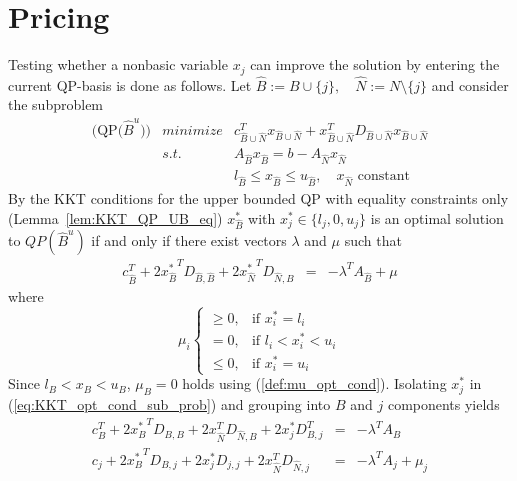 \documentclass[a4paper]{article}
\begin{document}
\section{Pricing}
Testing whether a nonbasic variable $x_{j}$ can improve the solution by entering the current QP-basis is done as follows.
Let $\hat{B}:=B \cup \{j\}, \quad \hat{N}:=N \setminus \{j\}$ and consider the subproblem
\begin{eqnarray}
  \mbox{(QP($\hat{B}^{u}$))} &minimize& c_{\hat{B} \cup \hat{N}}^{T}
    x_{\hat{B} \cup \hat{N}} +
    x_{\hat{B} \cup \hat{N}}^{T}
    D_{\hat{B} \cup \hat{N}}x_{\hat{B} \cup \hat{N}}
\nonumber      \\
\label{eq:QP_UB_sub_feas_cons}
    & s.t. & A_{\hat{B}}x_{\hat{B}} = b - A_{\hat{N}}
    x_{\hat{N}}  \\
\label{eq:QP_UB_sub_var_feas_cons}
    & & l_{\hat{B}} \leq x_{\hat{B}} \leq u_{\hat{B}},
    \quad x_{\hat{N}} \text{ constant}  
\end{eqnarray}
By the KKT conditions for the upper bounded QP with equality constraints only (Lemma~\ref{lem:KKT_QP_UB_eq}) $x_{\hat{B}}^{*}$ with
$x_{j}^{*} \in \{l_{j}, 0, u_{j}\}$
is an optimal solution to $QP(\hat{B}^{u})$ if and only if there exist vectors
$\lambda$ and $\mu$ such that
\begin{eqnarray}
\label{eq:KKT_opt_cond_sub_prob}
c_{\hat{B}}^{T}+2{x_{\hat{B}}^{*}}^{T}D_{\hat{B}, \hat{B}}
+2{x_{\hat{N}}^{*}}^{T}D_{\hat{N}, \hat{B}}
& = &
-\lambda^{T}A_{\hat{B}}+\mu 
\end{eqnarray}
where
\begin{equation}
\label{eq:KKT_opt_cond_sub_prob_mu}
\mu_{i}
\left\{
\begin{array}{ll}
\geq 0,
&
\text{if $x_{i}^{*}=l_{i}$} \\
=0,
&
\text{if $l_{i} < x_{i}^{*} < u_{i}$} \\
\leq 0,
&
\text{if $x_{i}^{*}=u_{i}$}
\end{array}
\right.
\end{equation}
Since $l_{B} < x_{B} < u_{B}$, $\mu_{B}=0$ holds using (\ref{def:mu_opt_cond}).
Isolating $x_{j}^{*}$ in (\ref{eq:KKT_opt_cond_sub_prob}) and grouping into $B$
and $j$ components yields
\begin{eqnarray}
\label{eq:KKT_lagrange_id_B}
  c_{B}^{T} + {2x_{B}^{*}}^{T}D_{B,B}
  + 2x_{\hat{N}}^{T}D_{\hat{N},B}
  + 2x_{j}^{*}D_{B,j}^{T} & = & -\lambda^{T} A_{B} \\
\label{eq:KKT_lagrange_id_j}
  c_{j} + 2{x_{B}^{*}}^{T}D_{B,j}
  + 2x_{j}^{*}D_{j,j}
  + 2x_{\hat{N}}^{T}D_{\hat{N},j} & = &
  -\lambda^{T} A_{j} + \mu_{j}
\end{eqnarray}
\end{document}
